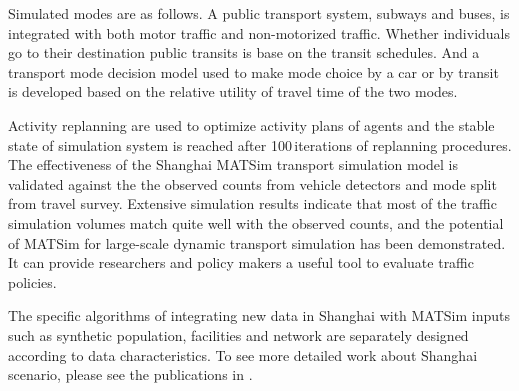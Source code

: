 Simulated modes are as follows. A public transport system, subways and buses, is integrated with both motor traffic and non-motorized traffic. Whether individuals go to their destination public transits is base on the transit schedules. And a transport mode decision model used to make mode choice by a car or by transit is developed based on the relative utility of travel time of the two modes.

Activity replanning are used to optimize activity plans of agents and the stable state of simulation system is reached after 100\,iterations of replanning procedures. The effectiveness of the Shanghai MATSim transport simulation model is validated against the the observed counts from vehicle detectors and mode split from travel survey. Extensive simulation results indicate that most of the traffic simulation volumes match quite well with the observed counts, and the potential of MATSim for large-scale dynamic transport simulation has been demonstrated. It can provide researchers and policy makers a useful tool to evaluate traffic policies. 

The specific algorithms of integrating new data in Shanghai with MATSim inputs such as synthetic population, facilities and network are separately designed according to data characteristics. To see more detailed work about Shanghai scenario, please see the publications in \citet[][]{ZhangLEtAl_TRR_2014}.

